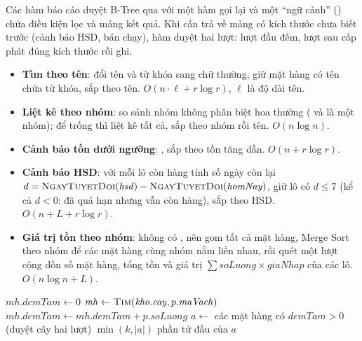 Các hàm báo cáo duyệt B-Tree qua  với một hàm gọi lại và một ``ngữ cảnh'' () chứa
điều kiện lọc và mảng kết quả. Khi cần trả về mảng có kích thước chưa biết trước (cảnh báo HSD, bán chạy), hàm
duyệt hai lượt: lượt đầu đếm, lượt sau cấp phát đúng kích thước rồi ghi.

\begin{itemize}
  \item \textbf{Tìm theo tên}: đổi tên và từ khóa sang chữ thường, giữ mặt hàng có tên chứa từ khóa, sắp theo
        tên. $O(n\cdot\ell + r\log r)$, $\ell$ là độ dài tên.
  \item \textbf{Liệt kê theo nhóm}: so sánh nhóm không phân biệt hoa thường ( và
         là một nhóm); để trống thì liệt kê tất cả, sắp theo nhóm rồi tên. $O(n\log n)$.
  \item \textbf{Cảnh báo tồn dưới ngưỡng}: , sắp theo tồn tăng dần. $O(n + r\log r)$.
  \item \textbf{Cảnh báo HSD}: với mỗi lô còn hàng tính số ngày còn lại
        $d = \textsc{NgayTuyetDoi}(\mathit{hsd}) - \textsc{NgayTuyetDoi}(\mathit{homNay})$, giữ lô có $d \le 7$
        (kể cả $d < 0$: đã quá hạn nhưng vẫn còn hàng), sắp theo HSD. $O(n + L + r\log r)$.
  \item \textbf{Giá trị tồn theo nhóm}: không có , nên gom tất cả mặt hàng, Merge Sort theo nhóm để các
        mặt hàng cùng nhóm nằm liền nhau, rồi quét một lượt cộng dồn số mặt hàng, tổng tồn và giá trị
        $\sum \mathit{soLuong}\times\mathit{giaNhap}$ của các lô. $O(n\log n + L)$.
\end{itemize}

\begin{algorithm}[htbp]
\caption{Top $k$ mặt hàng bán chạy trong tháng ()}\label{alg:top}
\begin{algorithmic}[1]
   $\mathit{mh}.\mathit{demTam} \gets 0$ \EndFor {}
   
      \State $\mathit{mh} \gets \Call{Tim}{\mathit{kho}.\mathit{cay}, p.\mathit{maVach}}$
       $\mathit{mh}.\mathit{demTam} \gets \mathit{mh}.\mathit{demTam} + p.\mathit{soLuong}$ \EndIf {}
    \EndIf
  \EndFor
  \State $a \gets$ các mặt hàng có $\mathit{demTam} > 0$ (duyệt cây hai lượt)
  \State {}
  \State \Return $\min(k, |a|)$ phần tử đầu của $a$
\EndFunction
\end{algorithmic}
\end{algorithm}

